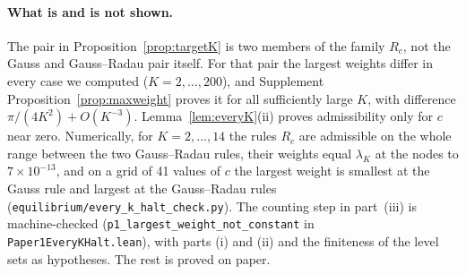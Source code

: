 \paragraph{What is and is not shown.} The pair in Proposition~\ref{prop:targetK} is two members of the family $R_c$, not the Gauss and Gauss--Radau pair itself. For that pair the largest weights differ in every case we computed ($K=2,\ldots,200$), and Supplement Proposition~\ref{prop:maxweight} proves it for all sufficiently large $K$, with difference $\pi/(4K^2)+O(K^{-3})$. Lemma~\ref{lem:everyK}(ii) proves admissibility only for $c$ near zero. Numerically, for $K=2,\ldots,14$ the rules $R_c$ are admissible on the whole range between the two Gauss--Radau rules, their weights equal $\lambda_K$ at the nodes to $7\times10^{-13}$, and on a grid of 41 values of $c$ the largest weight is smallest at the Gauss rule and largest at the Gauss--Radau rules (\nolinkurl{equilibrium/every_k_halt_check.py}). The counting step in part~(iii) is machine-checked (\texttt{p1\_largest\_weight\_not\_constant} in \nolinkurl{Paper1EveryKHalt.lean}), with parts (i) and (ii) and the finiteness of the level sets as hypotheses. The rest is proved on paper.

